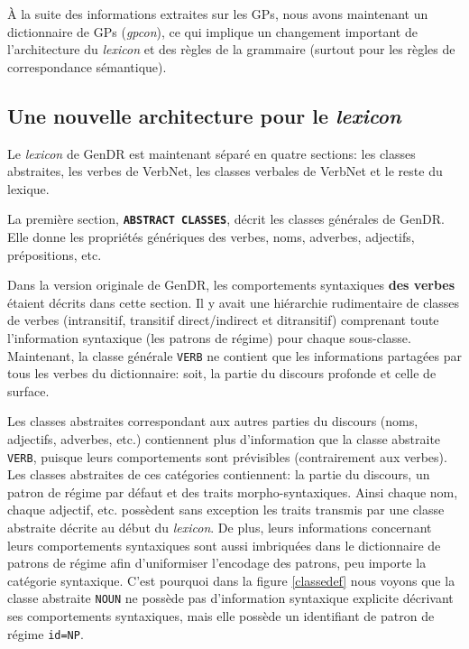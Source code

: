 À la suite des informations extraites sur les \acp{GP}, nous avons maintenant un dictionnaire de \acp{GP} (\emph{gpcon}), ce qui implique un changement important de l'architecture du \emph{lexicon} et des règles de la grammaire (surtout pour les règles de correspondance sémantique).


\subsection{Une nouvelle architecture pour le \emph{lexicon}}

Le \emph{lexicon} de GenDR est maintenant séparé en quatre sections: les classes abstraites, les verbes de VerbNet, les classes verbales de VerbNet et le reste du lexique.

La première section, \textbf{\texttt{ABSTRACT CLASSES}}, décrit les classes générales de GenDR. Elle donne les propriétés génériques des verbes, noms, adverbes, adjectifs, prépositions, etc.

Dans la version originale de GenDR, les comportements syntaxiques \textbf{des verbes} étaient décrits dans cette section. Il y avait une hiérarchie rudimentaire de classes de verbes (intransitif, transitif direct/indirect et ditransitif) comprenant toute l'information syntaxique (les patrons de régime) pour chaque sous-classe. Maintenant, la classe générale \texttt{VERB} ne contient que les informations partagées par tous les verbes du dictionnaire: soit, la partie du discours profonde et celle de surface. 

Les classes abstraites correspondant aux autres parties du discours (noms, adjectifs, adverbes, etc.) contiennent plus d'information que la classe abstraite \texttt{VERB}, puisque leurs comportements sont prévisibles (contrairement aux verbes). Les classes abstraites de ces catégories contiennent: la partie du discours, un patron de régime par défaut et des traits morpho-syntaxiques. Ainsi chaque nom, chaque adjectif, etc. possèdent sans exception les traits transmis par une classe abstraite décrite au début du \emph{lexicon}. De plus, leurs informations concernant leurs comportements syntaxiques sont aussi imbriquées dans le dictionnaire de patrons de régime afin d'uniformiser l'encodage des patrons, peu importe la catégorie syntaxique. C'est pourquoi dans la figure \ref{classedef} nous voyons que la classe abstraite \texttt{NOUN} ne possède pas d'information syntaxique explicite décrivant ses comportements syntaxiques, mais elle possède un identifiant de patron de régime \texttt{id=NP}.

